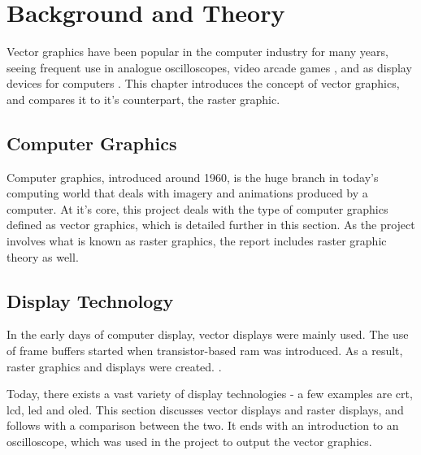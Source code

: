 \chapter{Background and Theory}
\label{chp:background}

Vector graphics have been popular in the computer industry for many years,
seeing frequent use in analogue oscilloscopes, video arcade games \cite{astroids},
and as display devices for computers \cite{ibm2250}\cite{tektronix4010}.
This chapter introduces the concept of vector graphics, and compares it to it's counterpart, the raster graphic.

\section{Computer Graphics}
Computer graphics, introduced around 1960\cite[sec. 1.1.1]{graphics-visualization-algorithms}, is the huge branch in today's computing world that deals with imagery and animations produced by a computer.
At it's core, this project deals with the type of computer graphics defined as vector graphics, which is detailed further in this section.
As the project involves what is known as raster graphics, the report includes raster graphic theory as well.





\section{Display Technology}
In the early days of computer display, vector displays were mainly used.
The use of frame buffers started when transistor-based \gls{ram} was introduced.
As a result, raster graphics and displays were created. \cite[sec. 1.1]{graphics-visualization-algorithms}.

Today, there exists a vast variety of display technologies - a few examples are \gls{crt}, \gls{lcd}, \gls{led} and \gls{oled}.
This section discusses vector displays and raster displays, and follows with a comparison between the two. It ends with an introduction to an oscilloscope, which was used in the project to output the vector graphics.






